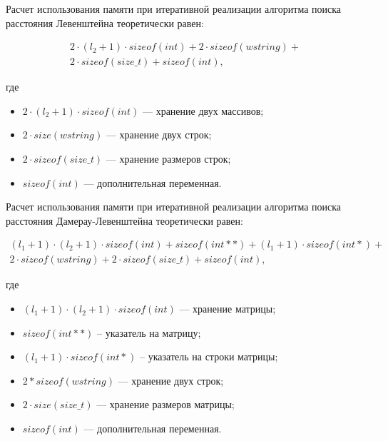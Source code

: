 Расчет использования памяти при итеративной реализации алгоритма поиска расстояния Левенштейна теоретически равен:

\begin{equation}
	\label{eq:lev_mtr_memory}
	\begin{aligned}
		2 \cdot (l_2 + 1) \cdot sizeof(int) +  2 \cdot sizeof(wstring) + \\
		 2 \cdot sizeof(size\_t) + sizeof(int),
	\end{aligned}
\end{equation}

где 
\begin{itemize}[label=--]
	\item $2 \cdot (l_2 + 1) \cdot sizeof(int)$ --- хранение двух массивов;
	\item $2 \cdot size(wstring)$ --- хранение двух строк;
	\item $2 \cdot sizeof(size\_t)$ --- хранение размеров строк;
	\item $sizeof(int)$ --- дополнительная переменная.
\end{itemize}

Расчет использования памяти при итеративной реализации алгоритма поиска расстояния Дамерау-Левенштейна теоретически равен:

\begin{equation}
	\label{eq:dl_mtr_memory}
	\begin{aligned}
		(l_1 + 1) \cdot (l_2 + 1) \cdot sizeof(int) + sizeof(int **) + (l_1 + 1) \cdot sizeof(int *) +  \\
		2 \cdot sizeof(wstring) + 2 \cdot sizeof(size\_t) + sizeof(int),
	\end{aligned}
\end{equation}

где 
\begin{itemize} [label=--]
	\item $(l_1 + 1) \cdot (l_2 + 1) \cdot sizeof(int)$ --- хранение матрицы;
	\item $sizeof(int **)$ -- указатель на матрицу;
	\item $(l_1 + 1) \cdot sizeof(int *)$ -- указатель на строки матрицы;
	\item $2 * sizeof(wstring)$ --- хранение двух строк;
	\item $2 \cdot size(size\_t)$ --- хранение размеров матрицы;
	\item $sizeof(int)$ --- дополнительная переменная.
\end{itemize}

